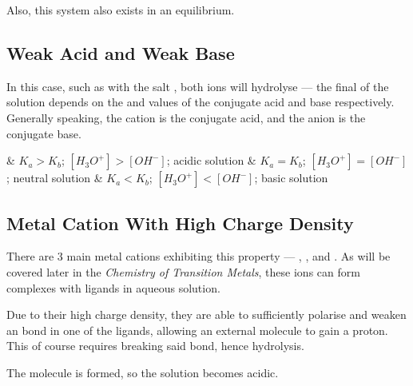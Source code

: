 			Also, this system also exists in an equilibrium.



		\subsection{Weak Acid and Weak Base}

			In this case, such as with the salt , both ions will hydrolyse --- the final \pH{} of the solution depends on
			the \Ka{} and \Kb{} values of the conjugate acid and base respectively. Generally speaking, the cation is the conjugate acid,
			and the anion is the conjugate base.

			\begin{bulletlist}
				& $K_{a} > K_{b}$;\hspace{4mm} $[H_{3}O^{+}] > [OH^{-}]$;\hspace{4mm} acidic solution
				& $K_{a} = K_{b}$;\hspace{4mm} $[H_{3}O^{+}] = [OH^{-}]$;\hspace{4mm} neutral solution
				& $K_{a} < K_{b}$;\hspace{4mm} $[H_{3}O^{+}] < [OH^{-}]$;\hspace{4mm} basic solution
			\end{bulletlist}



		\subsection{Metal Cation With High Charge Density}

			There are 3 main metal cations exhibiting this property --- , , and . As will be covered later
			in the \textit{Chemistry of Transition Metals}, these ions can form complexes with  ligands in aqueous solution.

			Due to their high charge density, they are able to sufficiently polarise and weaken an  bond in one of the ligands,
			allowing an external  molecule to gain a proton. This of course requires breaking said  bond, hence hydrolysis.

			The  molecule is formed, so the solution becomes acidic.




